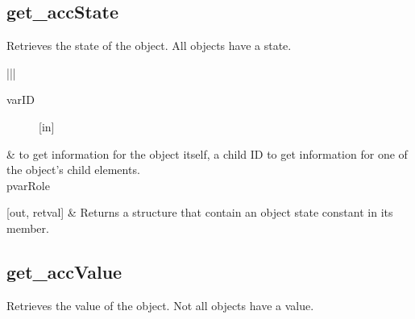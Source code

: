 \documentclass[letterpaper,12pt,english,openany,oneside]{sphinxmanual}
\begin{document}

\begin{sphinxVerbatim}[commandchars=\\\{\}]
\end{sphinxVerbatim}


\subsection{get\_accState}
\label{\detokenize{MSAA_PDF:get-accstate}}
Retrieves the state of the object. All objects have a state.

\begin{sphinxVerbatim}[commandchars=\\\{\}]
     
\end{sphinxVerbatim}



\begin{savenotes}\sphinxattablestart
\centering
{}\label{\detokenize{MSAA_PDF:section-10}}\nobreak
\begin{tabular}[t]{|*{2}{|}}
\hline
\begin{description}
\item[{varID}] \leavevmode
{[}in{]}

\end{description}
&
 to get information for the object itself, a child ID to get information for one of the object’s child elements.
\\
\hline
pvarRole

{[}out, retval{]}
&
Returns a structure that contain an object state constant in its  member.
\\
\hline
\end{tabular}
\par
\sphinxattableend\end{savenotes}


\begin{sphinxVerbatim}[commandchars=\\\{\}]
\end{sphinxVerbatim}


\subsection{get\_accValue}
\label{\detokenize{MSAA_PDF:get-accvalue}}
Retrieves the value of the object. Not all objects have a value.
\end{document}
